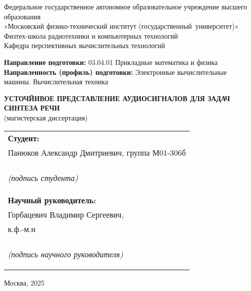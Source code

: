 \begin{center}
    Федеральное государственное автономное образовательное учреждение высшего образования\\
    «Московский физико-технический институт \pt(государственный~университет)»\\

    Физтех-школа радиотехники и компьютерных технологий\\
    Кафедра перспективных вычислительных технологий\\
\end{center}

\noindent
\textbf{Направление подготовки:} 03.04.01 Прикладные математика и физика\\
\textbf{Направленность (профиль) подготовки:} Электронные  вычислительные машины. Вычислительная техника\\

\begin{center}

    \textbf{УСТОЧЙИВОЕ ПРЕДСТАВЛЕНИЕ АУДИОСИГНАЛОВ ДЛЯ ЗАДАЧ СИНТЕЗА РЕЧИ}\\
    (магистерская диссертация)\\[15mm]

\end{center}


\hfill\begin{tabular}{@{}p{.5\linewidth}@{}}

    \textbf{Студент:}\\
    Панюков Александр Дмитриевич, группа М01-306б\\
    \uline{\hfill}\\
    \begin{center}\textit{(подпись студента)}\end{center}\\

    \textbf{Научный руководитель:}\\
    Горбацевич Владимир Сергеевич,\\
    к.ф.-м.н\\
    \uline{\hfill}\\
    \begin{center}\textit{(подпись научного руководителя)}\end{center}\\

\end{tabular}


\vfill

\begin{center}
    Москва, 2025
\end{center}

\thispagestyle{empty}
